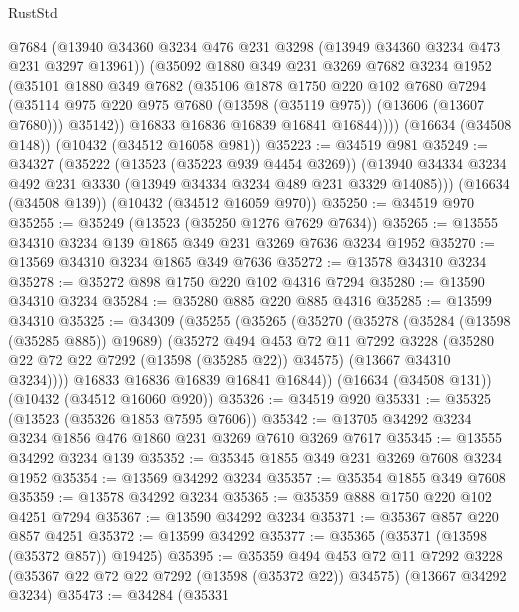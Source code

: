 \begin{lexlean}{RustStd}
\begin{coremodule}
          @7684
          (@13940 @34360 @3234 @476 @231 @3298 (@13949 @34360 @3234 @473 @231 @3297 @13961))
          (@35092
            @1880
            @349
            @231
            @3269
            @7682
            @3234
            @1952
            (@35101
              @1880
              @349
              @7682
              (@35106
                @1878
                @1750
                @220
                @102
                @7680
                @7294
                (@35114 @975 @220 @975 @7680 (@13598 (@35119 @975)) (@13606 (@13607 @7680)))
                @35142))
            @16833
            @16836
            @16839
            @16841
            @16844))))
    (@16634 (@34508 @148))
    (@10432 (@34512 @16058 @981))
@35223 := @34519 @981
@35249 := @34327
    (@35222
      (@13523 (@35223 @939 @4454 @3269))
      (@13940 @34334 @3234 @492 @231 @3330 (@13949 @34334 @3234 @489 @231 @3329 @14085)))
    (@16634 (@34508 @139))
    (@10432 (@34512 @16059 @970))
@35250 := @34519 @970
@35255 := @35249 (@13523 (@35250 @1276 @7629 @7634))
@35265 := @13555 @34310 @3234 @139 @1865 @349 @231 @3269 @7636 @3234 @1952
@35270 := @13569 @34310 @3234 @1865 @349 @7636
@35272 := @13578 @34310 @3234
@35278 := @35272 @898 @1750 @220 @102 @4316 @7294
@35280 := @13590 @34310 @3234
@35284 := @35280 @885 @220 @885 @4316
@35285 := @13599 @34310
@35325 := @34309
    (@35255
      (@35265
        (@35270
          (@35278
            (@35284 (@13598 (@35285 @885)) @19689)
            (@35272
              @494
              @453
              @72
              @11
              @7292
              @3228
              (@35280 @22 @72 @22 @7292 (@13598 (@35285 @22)) @34575)
              (@13667 @34310 @3234))))
        @16833
        @16836
        @16839
        @16841
        @16844))
    (@16634 (@34508 @131))
    (@10432 (@34512 @16060 @920))
@35326 := @34519 @920
@35331 := @35325 (@13523 (@35326 @1853 @7595 @7606))
@35342 := @13705 @34292 @3234 @3234 @1856 @476 @1860 @231 @3269 @7610 @3269 @7617
@35345 := @13555 @34292 @3234 @139
@35352 := @35345 @1855 @349 @231 @3269 @7608 @3234 @1952
@35354 := @13569 @34292 @3234
@35357 := @35354 @1855 @349 @7608
@35359 := @13578 @34292 @3234
@35365 := @35359 @888 @1750 @220 @102 @4251 @7294
@35367 := @13590 @34292 @3234
@35371 := @35367 @857 @220 @857 @4251
@35372 := @13599 @34292
@35377 := @35365 (@35371 (@13598 (@35372 @857)) @19425)
@35395 := @35359
    @494
    @453
    @72
    @11
    @7292
    @3228
    (@35367 @22 @72 @22 @7292 (@13598 (@35372 @22)) @34575)
    (@13667 @34292 @3234)
@35473 := @34284
    (@35331

\end{coremodule}
\end{lexlean}
